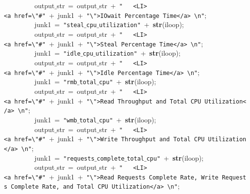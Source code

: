 \mbox{}\ \ \ \ \ \ \ \ \ output$\_$str\ =\ output$\_$str\ +\ \texttt{"{}\ \ \ \textless{}LI\textgreater{}\textless{}a\ href=\textbackslash{}"{}\#"{}}\ +\ junk1\ +\ \texttt{"{}\textbackslash{}"{}\textgreater{}IOwait\ Percentage\ Time\textless{}/a\textgreater{}\ \textbackslash{}n"{}}; \\
\mbox{}\ \ \ \ \ \ \ \ \ junk1\ =\ \texttt{"{}steal$\_$cpu$\_$utilization"{}}\ +\ \textbf{str}(iloop); \\
\mbox{}\ \ \ \ \ \ \ \ \ output$\_$str\ =\ output$\_$str\ +\ \texttt{"{}\ \ \ \textless{}LI\textgreater{}\textless{}a\ href=\textbackslash{}"{}\#"{}}\ +\ junk1\ +\ \texttt{"{}\textbackslash{}"{}\textgreater{}Steal\ Percentage\ Time\textless{}/a\textgreater{}\ \textbackslash{}n"{}}; \\
\mbox{}\ \ \ \ \ \ \ \ \ junk1\ =\ \texttt{"{}idle$\_$cpu$\_$utilization"{}}\ +\ \textbf{str}(iloop); \\
\mbox{}\ \ \ \ \ \ \ \ \ output$\_$str\ =\ output$\_$str\ +\ \texttt{"{}\ \ \ \textless{}LI\textgreater{}\textless{}a\ href=\textbackslash{}"{}\#"{}}\ +\ junk1\ +\ \texttt{"{}\textbackslash{}"{}\textgreater{}Idle\ Percentage\ Time\textless{}/a\textgreater{}\ \textbackslash{}n"{}}; \\
\mbox{}\ \ \ \ \ \ \ \ \ junk1\ =\ \texttt{"{}rmb$\_$total$\_$cpu"{}}\ +\ \textbf{str}(iloop); \\
\mbox{}\ \ \ \ \ \ \ \ \ output$\_$str\ =\ output$\_$str\ +\ \texttt{"{}\ \ \ \textless{}LI\textgreater{}\textless{}a\ href=\textbackslash{}"{}\#"{}}\ +\ junk1\ +\ \texttt{"{}\textbackslash{}"{}\textgreater{}Read\ Throughput\ and\ Total\ CPU\ Utilization\textless{}/a\textgreater{}\ \textbackslash{}n"{}}; \\
\mbox{}\ \ \ \ \ \ \ \ \ junk1\ =\ \texttt{"{}wmb$\_$total$\_$cpu"{}}\ +\ \textbf{str}(iloop); \\
\mbox{}\ \ \ \ \ \ \ \ \ output$\_$str\ =\ output$\_$str\ +\ \texttt{"{}\ \ \ \textless{}LI\textgreater{}\textless{}a\ href=\textbackslash{}"{}\#"{}}\ +\ junk1\ +\ \texttt{"{}\textbackslash{}"{}\textgreater{}Write\ Throughput\ and\ Total\ CPU\ Utilization\textless{}/a\textgreater{}\ \textbackslash{}n"{}}; \\
\mbox{}\ \ \ \ \ \ \ \ \ junk1\ =\ \texttt{"{}requests$\_$complete$\_$total$\_$cpu"{}}\ +\ \textbf{str}(iloop); \\
\mbox{}\ \ \ \ \ \ \ \ \ output$\_$str\ =\ output$\_$str\ +\ \texttt{"{}\ \ \ \textless{}LI\textgreater{}\textless{}a\ href=\textbackslash{}"{}\#"{}}\ +\ junk1\ +\ \texttt{"{}\textbackslash{}"{}\textgreater{}Read\ Requests\ Complete\ Rate,\ Write\ Requests\ Complete\ Rate,\ and\ Total\ CPU\ Utilization\textless{}/a\textgreater{}\ \textbackslash{}n"{}}; \\
